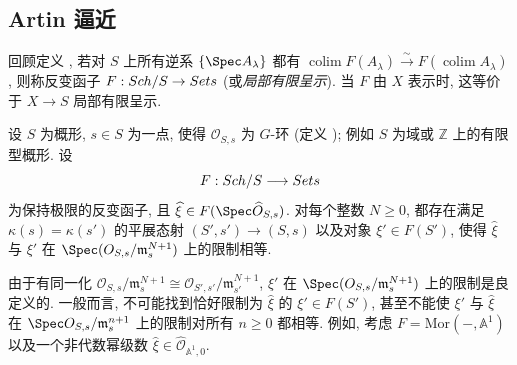 \subsection{Artin 逼近}\label{src:B.5.5-subsection}
回顾定义 , 若对 $S$ 上所有逆系 $\{\Spec A_\lambda\}$ 都有 $\operatorname{colim}F(A_\lambda)\xrightarrow{\sim}F(\operatorname{colim}A_\lambda)$, 则称反变函子 $F:Sch/S\to Sets$  (或\textit{局部有限呈示}). 当 $F$ 由 $X$ 表示时, 这等价于 $X\to S$ 局部有限呈示.
\begin{theorem}[Artin 逼近]\label{src:B.5.18}
设 $S$ 为概形, $s\in S$ 为一点, 使得 $\mathcal O_{S,s}$ 为 $G$-环 (定义 ); 例如 $S$ 为域或 $\mathbb Z$ 上的有限型概形. 设
\[
F:Sch/S\longrightarrow Sets
\]
为保持极限的反变函子, 且 $\widehat\xi\in F(\Spec\widehat{\mathcal O}_{S,s})$. 对每个整数 $N\geq0$, 都存在满足 $\kappa(s)=\kappa(s')$ 的平展态射 $(S',s')\to(S,s)$ 以及对象 $\xi'\in F(S')$, 使得 $\widehat\xi$ 与 $\xi'$ 在 $\Spec(\mathcal O_{S,s}/\mathfrak m_s^{N+1})$ 上的限制相等.
\end{theorem}
由于有同一化 $\mathcal O_{S,s}/\mathfrak m_s^{N+1}\cong\mathcal O_{S',s'}/\mathfrak m_{s'}^{N+1}$, $\xi'$ 在 $\Spec(\mathcal O_{S,s}/\mathfrak m_s^{N+1})$ 上的限制是良定义的. 一般而言, 不可能找到恰好限制为 $\widehat\xi$ 的 $\xi'\in F(S')$, 甚至不能使 $\xi'$ 与 $\widehat\xi$ 在 $\Spec\mathcal O_{S,s}/\mathfrak m_s^{n+1}$ 上的限制对所有 $n\geq0$ 都相等. 例如, 考虑 $F=\mathrm{Mor}(-,\mathbb A^1)$ 以及一个非代数幂级数 $\widehat\xi\in\widehat{\mathcal O}_{\mathbb A^1,0}$.
